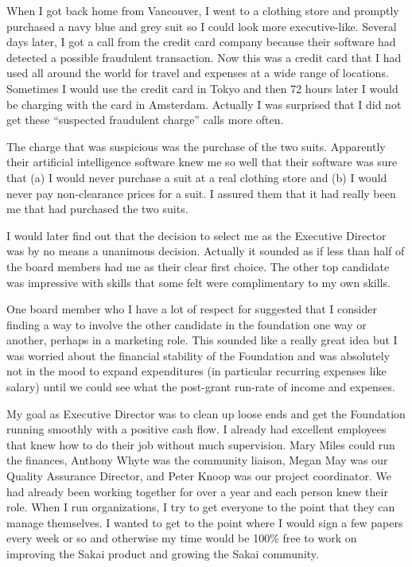 \documentclass[12pt]{book}
\begin{document}
When I got back home from Vancouver, I went to a clothing store and promptly
purchased a navy blue and grey suit so I could look more executive-like.
Several days later, I got a call from the credit card company because their
software had detected a possible fraudulent transaction.  Now this was a credit
card that I had used all around the world for travel and expenses at a wide range
of locations.  Sometimes I would use the credit card in Tokyo and then 72 hours
later I would be charging with the card in Amsterdam.   Actually I was surprised that
I did not get these ``suspected fraudulent charge'' calls more often.

The charge that was suspicious was the purchase of the two suits.  Apparently
their artificial intelligence software knew me so well that their software was sure that
(a) I would never purchase a suit at a real clothing store and (b) I would never
pay non-clearance prices for a suit. I assured them that it had really been me
that had purchased the two suits.

I would later find out that the decision to select me as the Executive Director
was by no means a unanimous decision.   Actually it sounded as if less than half
of the board members had me as their clear first choice.  The other top candidate
was impressive with skills that some felt were complimentary to my
own skills.

One board member who I have a lot of respect for suggested that I consider finding
a way to involve the other candidate in the foundation one way or another, perhaps
in a marketing role.  This sounded like a really great idea but I was worried
about the financial stability of the Foundation and was absolutely not in the mood
to expand expenditures (in particular recurring expenses like salary) until
we could see what the post-grant run-rate of income
and expenses.

My goal as Executive Director was to clean up loose ends and get the Foundation
running smoothly with a positive cash flow.  I already had excellent employees
that knew how to do their job without much supervision.  Mary Miles could run the
finances, Anthony Whyte was the community liaison, Megan May was our Quality
Assurance Director, and Peter Knoop was our project coordinator.   We had already
been working together for over a year and each person knew their role.
When I run organizations, I try to get everyone to the point that they can manage
themselves.  I wanted to get to the point where I would sign a few papers every week
or so and otherwise my time would be 100\% free to work on improving the Sakai
product and growing the Sakai community.
\end{document}
